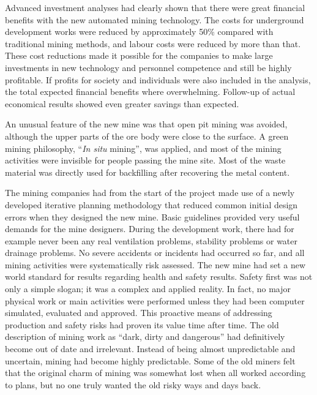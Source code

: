 \documentclass[
  12pt,
]{scrbook}
\begin{document}
Advanced investment analyses had clearly shown that there were great financial benefits with the new automated mining technology. The costs for underground development works were reduced by approximately 50\% compared with traditional mining methods, and labour costs were reduced by more than that. These cost reductions made it possible for the companies to make large investments in new technology and personnel competence and still be highly profitable. If profits for society and individuals were also included in the analysis, the total expected financial benefits where overwhelming. Follow-up of actual economical results showed even greater savings than expected.

An unusual feature of the new mine was that open pit mining was avoided, although the upper parts of the ore body were close to the surface. A green mining philosophy, ``\emph{In situ} mining'', was applied, and most of the mining activities were invisible for people passing the mine site. Most of the waste material was directly used for backfilling after recovering the metal content.

The mining companies had from the start of the project made use of a newly developed iterative planning methodology that reduced common initial design errors when they designed the new mine. Basic guidelines provided very useful demands for the mine designers. During the development work, there had for example never been any real ventilation problems, stability problems or water drainage problems. No severe accidents or incidents had occurred so far, and all mining activities were systematically risk assessed. The new mine had set a new world standard for results regarding health and safety results. Safety first was not only a simple slogan; it was a complex and applied reality. In fact, no major physical work or main activities were performed unless they had been computer simulated, evaluated and approved. This proactive means of addressing production and safety risks had proven its value time after time. The old description of mining work as ``dark, dirty and dangerous'' had definitively become out of date and irrelevant. Instead of being almost unpredictable and uncertain, mining had become highly predictable. Some of the old miners felt that the original charm of mining was somewhat lost when all worked according to plans, but no one truly wanted the old risky ways and days back.
\end{document}
